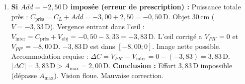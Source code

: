 \documentclass[11pt]{article}
\begin{document}
\begin{exoresolu}
\begin{enumerate}
    \item \textbf{Si $Add = +2,50\,\text{D}$ imposée (erreur de prescription) :}
    Puissance totale près : $C_{\text{près}} = C_L + Add = -3,00 + 2,50 = -0,50\,\text{D}$.
    Objet $30\,\text{cm}$ ($V=-3,33\,\text{D}$).
    Vergence entrant dans l'œil : $V_{\text{inter}} = C_{\text{près}} + V_{\text{obj}} = -0,50 - 3,33 = -3,83\,\text{D}$.
    L'œil corrigé a $V_{PR'}=0$ et $V_{PP'}=-8,00\,\text{D}$.
    $-3,83\,\text{D}$ est dans $[ -8,00 ; 0 ]$. Image nette possible.
    Accommodation requise : $\Delta C = V_{PR'} - V_{\text{inter}} = 0 - (-3,83) = 3,83\,\text{D}$.
    $|\Delta C| = 3,83\,\text{D} > A_{\text{max}} = 2,00\,\text{D}$.
    \textbf{Conclusion :} Effort $3,83\,\text{D}$ impossible (dépasse $A_{\text{max}}$). Vision floue. Mauvaise correction.
\end{enumerate}
\end{exoresolu}
\end{document}
